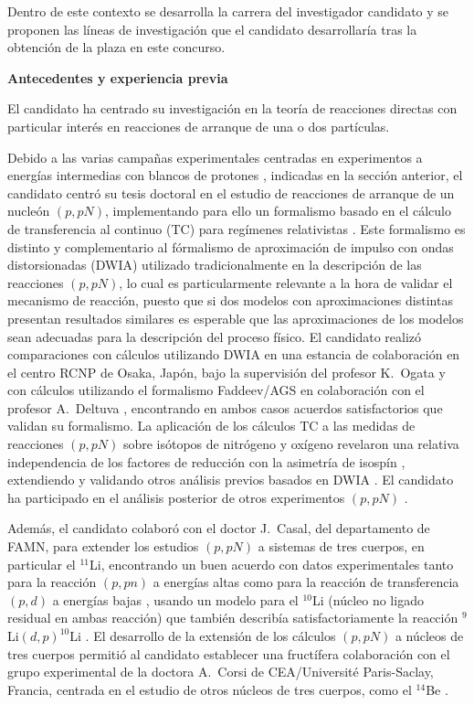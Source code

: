 \documentclass[a4paper,12pt,twoside]{article}
\begin{document}
Dentro de este contexto se desarrolla la carrera del investigador candidato y se proponen las líneas de investigación que el candidato desarrollaría tras la obtención de la plaza en este concurso.

\textbf{Antecedentes y experiencia previa}

El candidato ha centrado su investigación en la teoría de reacciones directas con particular interés en reacciones de arranque de una o dos partículas.

Debido a las varias campañas experimentales centradas en experimentos a energías intermedias con blancos de protones \cite{r3b07,Kaw18}, indicadas en la sección anterior, el candidato centró su tesis doctoral en el estudio de reacciones de arranque de un nucleón $(p,pN)$, implementando para ello un formalismo basado en el cálculo de transferencia al continuo (TC) para regímenes relativistas \cite{Mor15}. Este formalismo es distinto y complementario al fórmalismo de aproximación de impulso con ondas distorsionadas (DWIA) \cite{Jac66} utilizado tradicionalmente en la descripción de las reacciones $(p,pN)$, lo cual es particularmente relevante a la hora de validar el mecanismo de reacción, puesto que si dos modelos con aproximaciones distintas presentan resultados similares es esperable que las aproximaciones de los modelos sean adecuadas para la descripción del proceso físico. El candidato realizó comparaciones con cálculos utilizando DWIA en una estancia de colaboración en el centro RCNP de Osaka, Japón, bajo la supervisión del profesor K.~Ogata \cite{benchmarkdwia} y con cálculos utilizando el formalismo Faddeev/AGS \cite{Fad60, Alt67} en colaboración con el profesor A.~Deltuva \cite{benchmarkfaddeev}, encontrando en ambos casos acuerdos satisfactorios que validan su formalismo. La aplicación de los cálculos TC a las medidas de reacciones $(p,pN)$ sobre isótopos de nitrógeno y oxígeno revelaron una relativa independencia de los factores de reducción con la asimetría de isospín \cite{ppn}, extendiendo y validando otros análisis previos basados en DWIA \cite{Ata18}. El candidato ha participado en el análisis posterior de otros experimentos $(p,pN)$ \cite{thomas,49cl,49ar}.

Además, el candidato colaboró con el doctor J.~Casal, del departamento de FAMN, para extender los estudios $(p,pN)$ a sistemas de tres cuerpos, en particular el $^{11}$Li, encontrando un buen acuerdo con datos experimentales tanto para la reacción $(p,pn)$ a energías altas \cite{11lippn} como para la reacción de transferencia $(p,d)$ a energías bajas \cite{11lipd}, usando un modelo para el $^{10}$Li (núcleo no ligado residual en ambas reacción) que también describía satisfactoriamente la reacción $^9$Li$(d,p)^{10}$Li \cite{9lidp}. El desarrollo de la extensión de los cálculos $(p,pN)$ a núcleos de tres cuerpos permitió al candidato establecer una fructífera colaboración con el grupo experimental de la doctora A.~Corsi de CEA/Université Paris-Saclay, Francia, centrada en el estudio de otros núcleos de tres cuerpos, como el $^{14}$Be \cite{14be,openingangle}.
\end{document}
